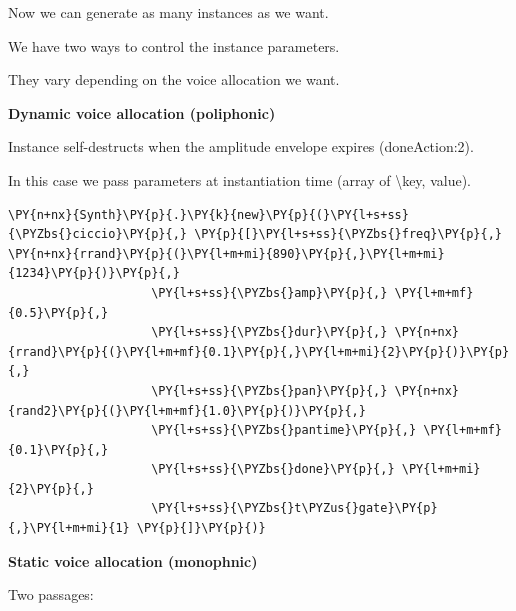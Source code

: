 Now we can generate as many instances as we want.

We have two ways to control the instance parameters.

They vary depending on the voice allocation we want.

\textbf{Dynamic voice allocation (poliphonic)} 

Instance self-destructs when the amplitude envelope expires (doneAction:2).

In this case we pass parameters at instantiation time (array of \textbackslash key, value).

\begin{tcolorbox}[breakable, size=fbox, boxrule=1pt, pad at break*=1mm,colback=cellbackground, colframe=cellborder]
\begin{Verbatim}[commandchars=\\\{\}]
\PY{n+nx}{Synth}\PY{p}{.}\PY{k}{new}\PY{p}{(}\PY{l+s+ss}{\PYZbs{}ciccio}\PY{p}{,} \PY{p}{[}\PY{l+s+ss}{\PYZbs{}freq}\PY{p}{,} \PY{n+nx}{rrand}\PY{p}{(}\PY{l+m+mi}{890}\PY{p}{,}\PY{l+m+mi}{1234}\PY{p}{)}\PY{p}{,} 
                    \PY{l+s+ss}{\PYZbs{}amp}\PY{p}{,} \PY{l+m+mf}{0.5}\PY{p}{,} 
                    \PY{l+s+ss}{\PYZbs{}dur}\PY{p}{,} \PY{n+nx}{rrand}\PY{p}{(}\PY{l+m+mf}{0.1}\PY{p}{,}\PY{l+m+mi}{2}\PY{p}{)}\PY{p}{,} 
                    \PY{l+s+ss}{\PYZbs{}pan}\PY{p}{,} \PY{n+nx}{rand2}\PY{p}{(}\PY{l+m+mf}{1.0}\PY{p}{)}\PY{p}{,} 
                    \PY{l+s+ss}{\PYZbs{}pantime}\PY{p}{,} \PY{l+m+mf}{0.1}\PY{p}{,} 
                    \PY{l+s+ss}{\PYZbs{}done}\PY{p}{,} \PY{l+m+mi}{2}\PY{p}{,} 
                    \PY{l+s+ss}{\PYZbs{}t\PYZus{}gate}\PY{p}{,}\PY{l+m+mi}{1} \PY{p}{]}\PY{p}{)}
\end{Verbatim}
\end{tcolorbox}

\textbf{Static voice allocation (monophnic)}

Two passages: 

